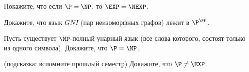 \begin{task}
   Покажите, что если $\P = \NP$, то $\EXP = \NEXP$. 
\end{task}

\begin{task}
	Докажите, что язык $GNI$ (пар неизоморфных графов) лежит в $\P^{\NP}$.
\end{task}

\begin{task}
    Пусть существует $\NP$-полный унарный язык (все слова которого, состоят только из одного символа). Докажите, что $\P = \NP$.
\end{task}


\begin{task} (подсказка: вспомните прошлый семестр)
    Докажите, что $\P \neq \EXP$.
\end{task}

